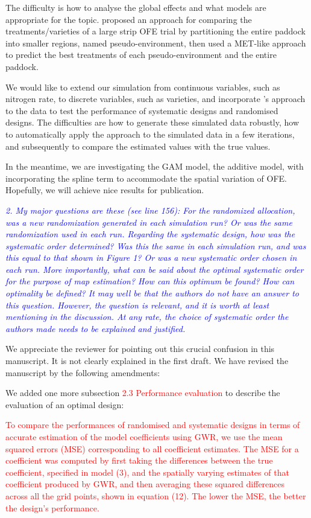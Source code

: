 \documentclass[a4paper]{article}   	%
\newcommand{\revision}[1]{\textcolor{red}{#1}}
\newcommand{\reviewer}[1]{\textcolor{blue}{\textit{#1}}}
\begin{document}
The difficulty is how to analyse the global effects and what models are appropriate for the topic. \textcite{Stefanova2023Statistical} proposed an approach for comparing the treatments/varieties of a large strip OFE trial by partitioning the entire paddock into smaller regions, named pseudo-environment, then used a MET-like approach to predict the best treatments of each pseudo-environment and the entire paddock. 

We would like to extend our simulation from continuous variables, such as nitrogen rate, to discrete variables, such as varieties, and incorporate \textcite{Stefanova2023Statistical}'s approach to the data to test the performance of systematic designs and randomised designs. The difficulties are how to generate these simulated data robustly,  how to automatically apply the approach to the simulated data in a few iterations, and subsequently to compare the estimated values with the true values.

In the meantime, we are investigating the GAM model, the additive model, with incorporating the spline term to accommodate the spatial variation of OFE. Hopefully, we will achieve nice results for publication. 


\reviewer{2. My major questions are these (see line 156): For the randomized allocation, was a new randomization generated in each simulation run? Or was the same randomization used in each run. Regarding the systematic design, how was the systematic order determined? Was this the same in each simulation run, and was this equal to that shown in Figure 1? Or was a new systematic order chosen in each run. More importantly, what can be said about the optimal systematic order for the purpose of map estimation? How can this optimum be found? How can optimality be defined? It may well be that the authors do not have an answer to this question. However, the question is relevant, and it is worth at least mentioning in the discussion. At any rate, the choice of systematic order the authors made needs to be explained and justified.}

We appreciate the reviewer for pointing out this crucial confusion in this manuscript. It is not clearly explained in the first draft. We have revised the manuscript by the following amendments: 



We added one more subsection \revision{2.3 Performance evaluation} to describe the evaluation of an optimal design: 


\revision{To compare the performances of randomised and systematic designs in terms of accurate estimation of the model coefficients using GWR, we use the mean squared errors (MSE) corresponding to all coefficient estimates. The MSE for a coefficient was computed by first taking the differences between the true coefficient, specified in model (3), and the spatially varying estimates of that coefficient produced by GWR, and then averaging these squared differences across all the grid points, shown in equation (12). The lower the MSE, the better the design's performance.} 
\end{document}
